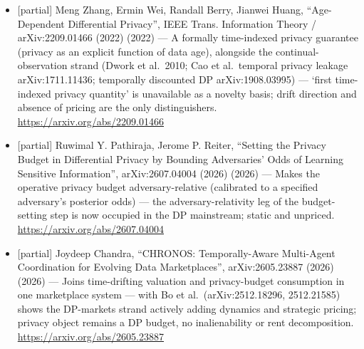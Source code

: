 \documentclass[
  11pt,
]{article}
\begin{document}
\begin{itemize}
  Law Review (2021) (2021) --- Maps data rights onto the
  Calabresi-Melamed property/liability/inalienability grid and argues
  propertization fails on asymmetric information and inferred-data
  leakage --- the structural-inalienability leg is occupied
  conceptually; the claim must show why `inalienable durable capital'
  evades these objections (alongside Malgieri \& Custers, ``Pricing
  privacy -- the right to know the value of your personal data'', CLSR
  2018).
  \url{https://papers.ssrn.com/sol3/papers.cfm?abstract_id=3564480}
\item
  {[}partial{]} Meng Zhang, Ermin Wei, Randall Berry, Jianwei Huang,
  ``Age-Dependent Differential Privacy'', IEEE Trans. Information Theory
  / arXiv:2209.01466 (2022) (2022) --- A formally time-indexed privacy
  guarantee (privacy as an explicit function of data age), alongside the
  continual-observation strand (Dwork et al.~2010; Cao et al.~temporal
  privacy leakage arXiv:1711.11436; temporally discounted DP
  arXiv:1908.03995) --- `first time-indexed privacy quantity' is
  unavailable as a novelty basis; drift direction and absence of pricing
  are the only distinguishers. \url{https://arxiv.org/abs/2209.01466}
\item
  {[}partial{]} Ruwimal Y. Pathiraja, Jerome P. Reiter, ``Setting the
  Privacy Budget in Differential Privacy by Bounding Adversaries' Odds
  of Learning Sensitive Information'', arXiv:2607.04004 (2026) (2026)
  --- Makes the operative privacy budget adversary-relative (calibrated
  to a specified adversary's posterior odds) --- the
  adversary-relativity leg of the budget-setting step is now occupied in
  the DP mainstream; static and unpriced.
  \url{https://arxiv.org/abs/2607.04004}
\item
  {[}partial{]} Joydeep Chandra, ``CHRONOS: Temporally-Aware Multi-Agent
  Coordination for Evolving Data Marketplaces'', arXiv:2605.23887 (2026)
  (2026) --- Joins time-drifting valuation and privacy-budget
  consumption in one marketplace system --- with Bo et
  al.~(arXiv:2512.18296, 2512.21585) shows the DP-markets strand
  actively adding dynamics and strategic pricing; privacy object remains
  a DP budget, no inalienability or rent decomposition.
  \url{https://arxiv.org/abs/2605.23887}
\end{itemize}
\end{document}
